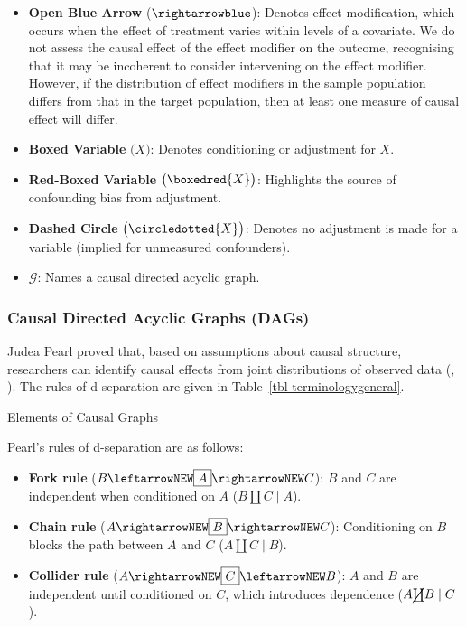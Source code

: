 \documentclass[
  single column]{article}
\providecommand{\tightlist}{%
  \setlength{\itemsep}{0pt}\setlength{\parskip}{0pt}}\usepackage{longtable,booktabs,array}
\begin{document}
\begin{itemize}
\item
  \textbf{Open Blue Arrow} (\(\rightarrowblue\)): Denotes effect
  modification, which occurs when the effect of treatment varies within
  levels of a covariate. We do not assess the causal effect of the
  effect modifier on the outcome, recognising that it may be incoherent
  to consider intervening on the effect modifier. However, if the
  distribution of effect modifiers in the sample population differs from
  that in the target population, then at least one measure of causal
  effect will differ.
\item
  \textbf{Boxed Variable} \(\big(\boxed{X}\big)\): Denotes conditioning
  or adjustment for \(X\).
\item
  \textbf{Red-Boxed Variable} \(\big(\boxedred{X}\big)\): Highlights the
  source of confounding bias from adjustment.
\item
  \textbf{Dashed Circle} \(\big(\circledotted{X}\big)\): Denotes no
  adjustment is made for a variable (implied for unmeasured
  confounders).
\item
  \textbf{\(\mathcal{G}\)}: Names a causal directed acyclic graph.
\end{itemize}

\subsubsection{Causal Directed Acyclic Graphs
(DAGs)}\label{causal-directed-acyclic-graphs-dags}

Judea Pearl proved that, based on assumptions about causal structure,
researchers can identify causal effects from joint distributions of
observed data (,
). The rules of d-separation are given in
Table~\ref{tbl-terminologygeneral}.

\begin{table}

\caption{\label{tbl-terminologygeneral}Elements of Causal Graphs}

\centering{

\terminologydirectedgraph

}

\end{table}%

Pearl's rules of d-separation are as follows:

\begin{itemize}
\tightlist
\item
  \textbf{Fork rule} (\(B \leftarrowNEW \boxed{A} \rightarrowNEW C\)):
  \(B\) and \(C\) are independent when conditioned on \(A\)
  (\(B \coprod C \mid A\)).
\item
  \textbf{Chain rule} (\(A \rightarrowNEW \boxed{B} \rightarrowNEW C\)):
  Conditioning on \(B\) blocks the path between \(A\) and \(C\)
  (\(A \coprod C \mid B\)).
\item
  \textbf{Collider rule}
  (\(A \rightarrowNEW \boxed{C} \leftarrowNEW B\)): \(A\) and \(B\) are
  independent until conditioned on \(C\), which introduces dependence
  (\(A \cancel{\coprod} B \mid C\)).
\end{itemize}
\end{document}
